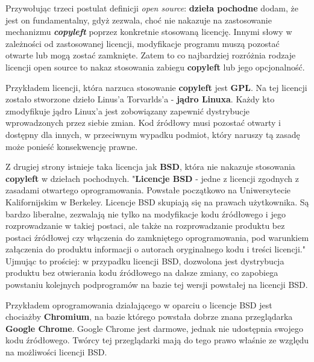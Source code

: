 \documentclass{article}
\begin{document}
Przywołując trzeci postulat definicji \emph{open source}: \textbf{dzieła pochodne} dodam, że jest on fundamentalny, gdyż zezwala, choć nie nakazuje na zastosowanie mechanizmu \textbf{\emph{copyleft}} poprzez konkretnie stosowaną licencję. Innymi słowy w zależności od zastosowanej licencji, modyfikacje programu muszą pozostać otwarte lub mogą zostać zamknięte. Zatem to co najbardziej rozróżnia rodzaje licencji open source to nakaz stosowania zabiegu \textbf{copyleft} lub jego opcjonalność.

Przykładem licencji, która narzuca stosowanie \textbf{copyleft} jest \textbf{GPL}. Na tej licencji zostało stworzone dzieło Linus'a Torvarlds'a -  \textbf{jądro Linuxa}. Każdy kto zmodyfikuje jądro Linux'a jest zobowiązany zapewnić dystrybucje wprowadzonych przez siebie zmian. Kod źródłowy musi pozostać otwarty i dostępny dla innych, w przeciwnym wypadku podmiot, który naruszy tą zasadę może ponieść konsekwencję prawne.

Z drugiej strony istnieje taka licencja jak \textbf{BSD}, która nie nakazuje stosowania \textbf{copyleft} w dziełach pochodnych. "\textbf{Licencje BSD} - jedne z licencji zgodnych z zasadami otwartego oprogramowania. Powstałe początkowo na Uniwersytecie Kalifornijskim w Berkeley. Licencje BSD skupiają się na prawach użytkownika. Są bardzo liberalne, zezwalają nie tylko na modyfikacje kodu źródłowego i jego rozprowadzanie w takiej postaci, ale także na rozprowadzanie produktu bez postaci źródłowej czy włączenia do zamkniętego oprogramowania, pod warunkiem załączenia do produktu informacji o autorach oryginalnego kodu i treści licencji\cite{wikipedia3}." Ujmując to prościej: w przypadku licencji BSD, dozwolona jest dystrybucja produktu bez otwierania kodu źródłowego na dalsze zmiany, co zapobiega powstaniu kolejnych podprogramów na bazie tej wersji powstałej na licencji BSD.

Przykładem oprogramowania działającego w oparciu o licencje BSD jest chociażby \textbf{Chromium}, na bazie którego powstała dobrze znana przeglądarka \textbf{Google Chrome}. Google Chrome jest darmowe, jednak nie udostępnia swojego kodu źródłowego. Twórcy tej przeglądarki mają do tego prawo właśnie ze względu na możliwości licencji BSD\cite{wikipedia3}. 
\end{document}
